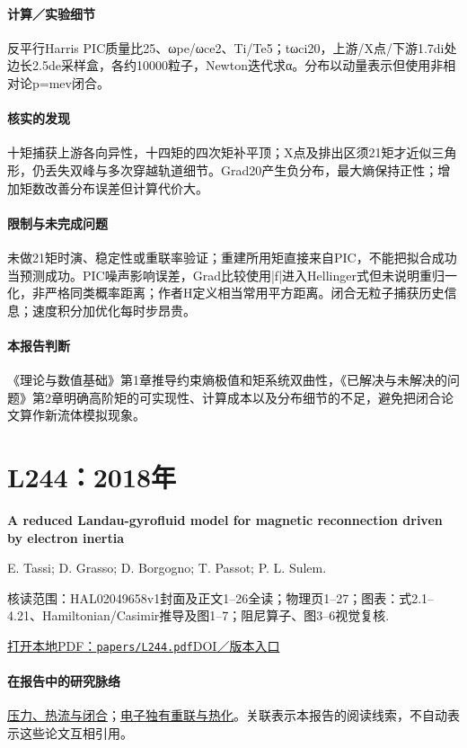 \documentclass[UTF8,a4paper,11pt,openany,fontset=fandol]{ctexbook}
\begin{document}
\paragraph{计算／实验细节}反平行Harris PIC质量比25、ωpe/ωce2、Ti/Te5；tωci20，上游/X点/下游1.7di处边长2.5de采样盒，各约10000粒子，Newton迭代求α。分布以动量表示但使用非相对论p=mev闭合。

\paragraph{核实的发现}十矩捕获上游各向异性，十四矩的四次矩补平顶；X点及排出区须21矩才近似三角形，仍丢失双峰与多次穿越轨道细节。Grad20产生负分布，最大熵保持正性；增加矩数改善分布误差但计算代价大。

\paragraph{限制与未完成问题}未做21矩时演、稳定性或重联率验证；重建所用矩直接来自PIC，不能把拟合成功当预测成功。PIC噪声影响误差，Grad比较使用|f|进入Hellinger式但未说明重归一化，非严格同类概率距离；作者H定义相当常用平方距离。闭合无粒子捕获历史信息；速度积分加优化每时步昂贵。

\paragraph{本报告判断}《理论与数值基础》第1章推导约束熵极值和矩系统双曲性，《已解决与未解决的问题》第2章明确高阶矩的可实现性、计算成本以及分布细节的不足，避免把闭合论文算作新流体模拟现象。

\section{L244：2018年}\label{paper:L244}

\textbf{A reduced Landau-gyrofluid model for magnetic reconnection driven by electron inertia}\citep{L244}\

E. Tassi;  D. Grasso;  D. Borgogno;  T. Passot;  P. L. Sulem.

\textsf{核读范围：}HAL02049658v1封面及正文1–26全读；物理页1–27；\textsf{图表：}式2.1–4.21、Hamiltonian/Casimir推导及图1–7；阻尼算子、图3–6视觉复核.

\href{run:../papers/L244.pdf}{打开本地PDF：\texttt{papers/L244.pdf}}\quad\href{https://doi.org/10.1017/S002237781800051X}{DOI／版本入口}

\paragraph{在报告中的研究脉络}\hyperref[story:closure]{压力、热流与闭合}；\hyperref[story:energy]{电子独有重联与热化}。关联表示本报告的阅读线索，不自动表示这些论文互相引用。
\end{document}
